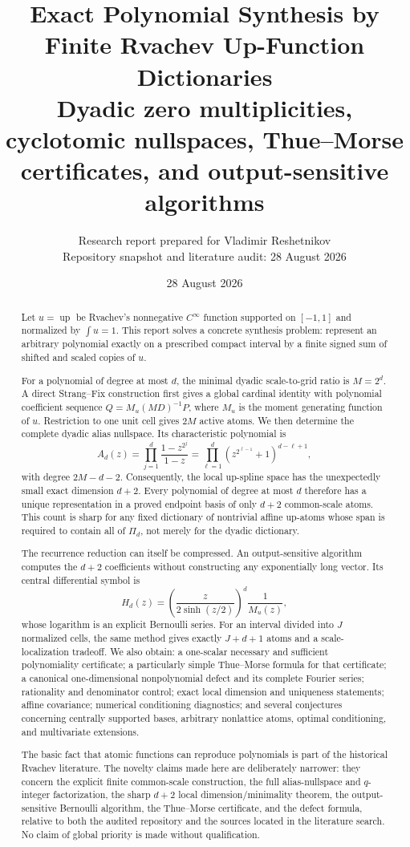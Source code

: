 \documentclass[11pt,oneside]{article}
\title{\bfseries Exact Polynomial Synthesis by Finite Rvachev Up-Function Dictionaries\\[0.4em]
\large Dyadic zero multiplicities, cyclotomic nullspaces, Thue--Morse certificates, and output-sensitive algorithms}
\author{Research report prepared for Vladimir Reshetnikov\\
\small Repository snapshot and literature audit: 28 August 2026}
\date{28 August 2026}
\theoremstyle{definition}
\theoremstyle{remark}
\newcommand{\Up}{\operatorname{up}}
\begin{document}
\maketitle

\begin{abstract}
Let $u=\Up$ be Rvachev's nonnegative $C^\infty$ function supported on $[-1,1]$ and normalized by $\int u=1$.  This report solves a concrete synthesis problem: represent an arbitrary polynomial exactly on a prescribed compact interval by a finite signed sum of shifted and scaled copies of $u$.

For a polynomial of degree at most $d$, the minimal dyadic scale-to-grid ratio is $M=2^d$.  A direct Strang--Fix construction first gives a global cardinal identity with polynomial coefficient sequence $Q=M_u(MD)^{-1}P$, where $M_u$ is the moment generating function of $u$.  Restriction to one unit cell gives $2M$ active atoms.  We then determine the complete dyadic alias nullspace.  Its characteristic polynomial is
\[
 A_d(z)=\prod_{j=1}^{d}\frac{1-z^{2^j}}{1-z}
       =\prod_{\ell=1}^{d}(z^{2^{\ell-1}}+1)^{d-\ell+1},
\]
with degree $2M-d-2$.  Consequently, the local up-spline space has the unexpectedly small exact dimension $d+2$.  Every polynomial of degree at most $d$ therefore has a unique representation in a proved endpoint basis of only $d+2$ common-scale atoms.  This count is sharp for any fixed dictionary of nontrivial affine up-atoms whose span is required to contain all of $\Pi_d$, not merely for the dyadic dictionary.

The recurrence reduction can itself be compressed.  An output-sensitive algorithm computes the $d+2$ coefficients without constructing any exponentially long vector.  Its central differential symbol is
\[
 H_d(z)=\left(\frac{z}{2\sinh(z/2)}\right)^d\frac1{M_u(z)},
\]
whose logarithm is an explicit Bernoulli series.  For an interval divided into $J$ normalized cells, the same method gives exactly $J+d+1$ atoms and a scale-localization tradeoff.  We also obtain: a one-scalar necessary and sufficient polynomiality certificate; a particularly simple Thue--Morse formula for that certificate; a canonical one-dimensional nonpolynomial defect and its complete Fourier series; rationality and denominator control; exact local dimension and uniqueness statements; affine covariance; numerical conditioning diagnostics; and several conjectures concerning centrally supported bases, arbitrary nonlattice atoms, optimal conditioning, and multivariate extensions.

The basic fact that atomic functions can reproduce polynomials is part of the historical Rvachev literature.  The novelty claims made here are deliberately narrower: they concern the explicit finite common-scale construction, the full alias-nullspace and $q$-integer factorization, the sharp $d+2$ local dimension/minimality theorem, the output-sensitive Bernoulli algorithm, the Thue--Morse certificate, and the defect formula, relative to both the audited repository and the sources located in the literature search.  No claim of global priority is made without qualification.
\end{abstract}
\end{document}

